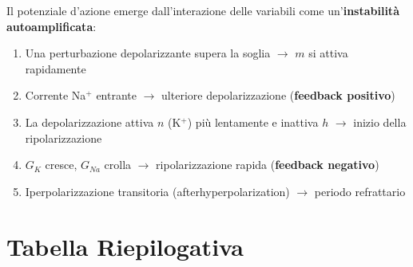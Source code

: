 Il potenziale d'azione emerge dall'interazione delle variabili come un'\textbf{instabilità autoamplificata}:

\begin{enumerate}
    \item Una perturbazione depolarizzante supera la soglia $\rightarrow$ $m$ si attiva rapidamente
    \item Corrente Na$^+$ entrante $\rightarrow$ ulteriore depolarizzazione (\textbf{feedback positivo})
    \item La depolarizzazione attiva $n$ (K$^+$) più lentamente e inattiva $h$ $\rightarrow$ inizio della ripolarizzazione
    \item $G_K$ cresce, $G_{Na}$ crolla $\rightarrow$ ripolarizzazione rapida (\textbf{feedback negativo})
    \item Iperpolarizzazione transitoria (afterhyperpolarization) $\rightarrow$ periodo refrattario
\end{enumerate}


\newpage
\section*{Tabella Riepilogativa}

